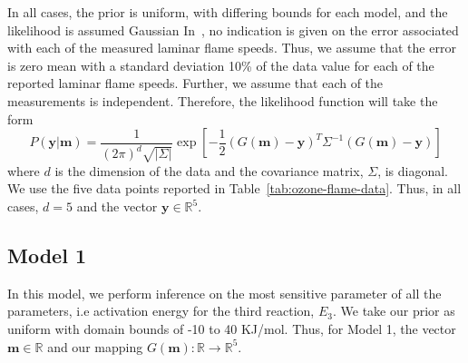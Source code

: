  In all cases,
the prior is uniform, with differing bounds for each model, and the
likelihood is assumed Gaussian In~\cite{Streng}, no indication is
given on the error associated with each of the measured laminar flame
speeds. Thus, we assume that the error is zero mean with a standard
deviation 10\% of the data value for each of the reported laminar
flame speeds. Further, we assume that each of the measurements is
independent. Therefore, the likelihood function will take the form
%
\begin{equation}
P(\mathbf{y}|\mathbf{m}) = \frac{1}{(2\pi)^d \sqrt{|\Sigma|}}
\exp\left[ -\frac{1}{2}\left(G(\mathbf{m}) -
  \mathbf{y}\right)^T\Sigma^{-1} \left(G(\mathbf{m}) -
  \mathbf{y}\right) \right]
\end{equation}
%
where $d$ is the dimension of the data and the covariance matrix, $\Sigma$, is diagonal.
We use the five data points reported in Table~\ref{tab:ozone-flame-data}.
Thus, in all cases, $d = 5$ and the vector $\mathbf{y} \in \mathbb{R}^5$.

 




\subsection{Model 1}
 In this model, we perform inference on the most
 sensitive parameter of all the parameters, i.e activation energy for
 the third reaction, $E_3$. We take our prior as uniform with domain
 bounds of -10 to 40 KJ/mol. Thus, for Model 1, the vector
 $\mathbf{m} \in \mathbb{R}$ and our mapping $G(\mathbf{m}):
 \mathbb{R} \rightarrow \mathbb{R}^5$.


